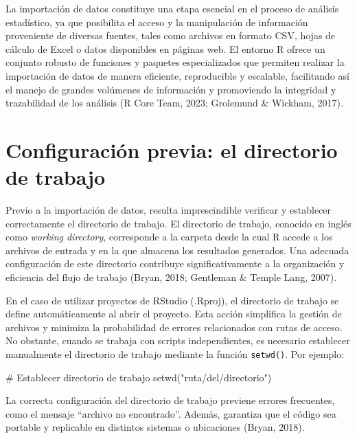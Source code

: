 \documentclass[
  spanish,
  a4paper,
  DIV=11,
  numbers=noendperiod,
  onepage,
  openany]{scrreprt}
\newenvironment{Shaded}{\begin{snugshade}}{\end{snugshade}}
\newcommand{\CommentTok}[1]{\textcolor[rgb]{0.37,0.37,0.37}{#1}}
\newcommand{\FunctionTok}[1]{\textcolor[rgb]{0.28,0.35,0.67}{#1}}
\newcommand{\NormalTok}[1]{\textcolor[rgb]{0.00,0.23,0.31}{#1}}
\newcommand{\StringTok}[1]{\textcolor[rgb]{0.13,0.47,0.30}{#1}}
\begin{document}
La importación de datos constituye una etapa esencial en el proceso de
análisis estadístico, ya que posibilita el acceso y la manipulación de
información proveniente de diversas fuentes, tales como archivos en
formato CSV, hojas de cálculo de Excel o datos disponibles en páginas
web. El entorno R ofrece un conjunto robusto de funciones y paquetes
especializados que permiten realizar la importación de datos de manera
eficiente, reproducible y escalable, facilitando así el manejo de
grandes volúmenes de información y promoviendo la integridad y
trazabilidad de los análisis (R Core Team, 2023; Grolemund \& Wickham,
2017).

\section{Configuración previa: el directorio de
trabajo}\label{configuraciuxf3n-previa-el-directorio-de-trabajo}

Previo a la importación de datos, resulta imprescindible verificar y
establecer correctamente el directorio de trabajo. El directorio de
trabajo, conocido en inglés como \emph{working directory}, corresponde a
la carpeta desde la cual R accede a los archivos de entrada y en la que
almacena los resultados generados. Una adecuada configuración de este
directorio contribuye significativamente a la organización y eficiencia
del flujo de trabajo (Bryan, 2018; Gentleman \& Temple Lang, 2007).

En el caso de utilizar proyectos de RStudio (.Rproj), el directorio de
trabajo se define automáticamente al abrir el proyecto. Esta acción
simplifica la gestión de archivos y minimiza la probabilidad de errores
relacionados con rutas de acceso. No obstante, cuando se trabaja con
scripts independientes, es necesario establecer manualmente el
directorio de trabajo mediante la función \texttt{setwd()}. Por ejemplo:

\begin{Shaded}
\begin{Highlighting}[]
\CommentTok{\# Establecer directorio de trabajo}
\FunctionTok{setwd}\NormalTok{(}\StringTok{"ruta/del/directorio"}\NormalTok{)}
\end{Highlighting}
\end{Shaded}

La correcta configuración del directorio de trabajo previene errores
frecuentes, como el mensaje ``archivo no encontrado''. Además, garantiza
que el código sea portable y replicable en distintos sistemas o
ubicaciones (Bryan, 2018).
\end{document}
